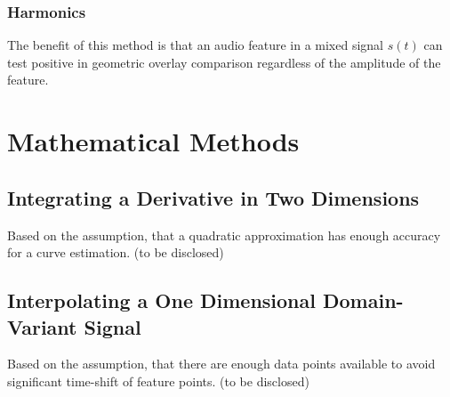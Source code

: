 \documentclass{report}
\begin{document}
\subsection{Harmonics}
The benefit of this method is that an audio feature in a mixed signal $s(t)$ can test positive in geometric overlay comparison regardless of the amplitude of the feature.

\chapter{Mathematical Methods}
\section{Integrating a Derivative in Two Dimensions}
Based on the assumption, that a quadratic approximation has enough accuracy for a curve estimation. (to be disclosed)
\section{Interpolating a One Dimensional Domain-Variant Signal}
Based on the assumption, that there are enough data points available to avoid significant time-shift of feature points. (to be disclosed)

\iffalse
\printbibliography
\fi
{}

\end{document}

